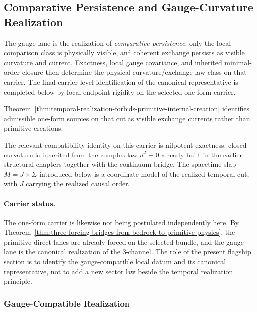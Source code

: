 \subsection{Comparative Persistence and Gauge-Curvature Realization}
\label{sec:flagship-gauge}

The gauge lane is the realization of \emph{comparative persistence}: only the
local comparison class is physically visible, and coherent exchange persists as
visible curvature and current. Exactness, local gauge covariance, and
inherited minimal-order closure then determine the physical
curvature/exchange law class on that carrier. The final carrier-level
identification of the canonical representative is completed below by local
endpoint rigidity on the selected one-form carrier.

Theorem~\ref{thm:temporal-realization-forbids-primitive-internal-creation}
identifies admissible one-form sources on that cut as visible exchange
currents rather than primitive creations.

The relevant compatibility identity on this carrier is nilpotent exactness:
closed curvature is inherited from the complex law \(d^2=0\) already built in
the earlier structural chapters together with the continuum bridge. The
spacetime slab \(M=J\times\Sigma\) introduced below is a
coordinate model of the realized temporal cut, with \(J\) carrying the
realized causal order.

\paragraph{Carrier status.}
The one-form carrier is likewise not being postulated independently here. By
Theorem~\ref{thm:three-forcing-bridges-from-bedrock-to-primitive-physics}, the
primitive direct lanes are already forced on the selected bundle, and the
gauge lane is the canonical realization of the \(3\)-channel. The role of the
present flagship section is to identify the gauge-compatible local datum and
its canonical representative, not to add a new sector law beside the temporal
realization principle.

\subsubsection{Gauge-Compatible Realization}


